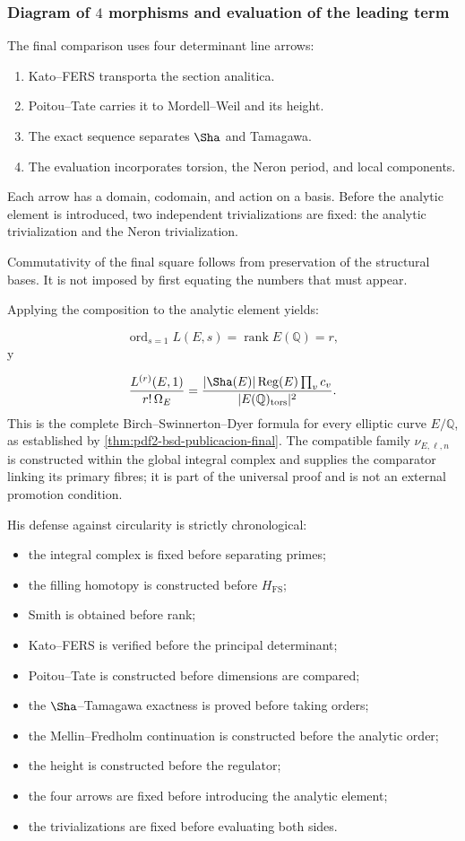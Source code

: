 \subsubsection{Diagram of \(4\) morphisms and evaluation of the leading term}
The final comparison uses four determinant line arrows:\par
\begin{enumerate}
\item Kato–FERS transporta the section analitica.
\item Poitou–Tate carries it to Mordell–Weil and its height.
\item The exact sequence separates \(\Sha\) and Tamagawa.
\item The evaluation incorporates torsion, the Neron period, and local components.
\end{enumerate}
Each arrow has a domain, codomain, and action on a basis. Before the analytic element is introduced, two independent trivializations are fixed: the analytic trivialization and the Neron trivialization.\par
Commutativity of the final square follows from preservation of the
structural bases. It is not imposed by first equating the numbers that must
appear.\par
Applying the composition to the analytic element yields:\par
\[
\operatorname{ord}_{s=1}L(E,s)
=
\operatorname{rank}E(\mathbb Q)
=
r,
\]
y\par
\[
\frac{L^{(r)}(E,1)}
{r!\,\Omega_E}
=
\frac{
|\Sha(E)|
\operatorname{Reg}(E)
\prod_v c_v
}{
|E(\mathbb Q)_{\mathrm{tors}}|^2
}.
\]
This is the complete Birch--Swinnerton--Dyer formula for every elliptic curve \(E/\mathbb Q\), as established by \cref{thm:pdf2-bsd-publicacion-final}. The compatible family \(\nu_{E,\ell,n}\) is constructed within the global integral complex and supplies the comparator linking its primary fibres; it is part of the universal proof and is not an external promotion condition.\par
His defense against circularity is strictly chronological:\par
\begin{itemize}
\item the integral complex is fixed before separating primes;
\item the filling homotopy is constructed before \(H_{\mathrm{FS}}\);
\item Smith is obtained before rank;
\item Kato--FERS is verified before the principal determinant;
\item Poitou–Tate is constructed before dimensions are compared;
\item the \(\Sha\)--Tamagawa exactness is proved before taking orders;
\item the Mellin–Fredholm continuation is constructed before the analytic order;
\item the height is constructed before the regulator;
\item the four arrows are fixed before introducing the analytic element;
\item the trivializations are fixed before evaluating both sides.
\end{itemize}
